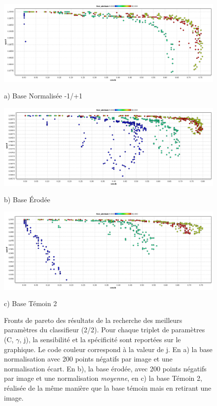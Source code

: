 \begin{figure}[h!]
\begin{center}


\includegraphics[width=14cm]{images/pareto_param_range.png}

{\small a) Base Normalisée -1/+1}

\vspace{0.5cm}

\includegraphics[width=14cm]{images/pareto_param_erosion.png}

{\small b) Base Érodée}

 \includegraphics[width=14cm]{images/pareto_param_200_2.png}

{\small c) Base Témoin 2}

\end{center}
 \caption{Fronts de pareto des résultats de la recherche des meilleurs paramètres du classifieur (2/2). Pour chaque triplet de paramètres (C, $\gamma$, j), la sensibilité et la spécificité sont reportées sur le graphique. Le code couleur correspond à la valeur de j. En a) la base normalisation avec 200 points négatifs par image et une normalisation écart. En b), la base érodée, avec 200 points négatifs par image et une normalisation \emph{moyenne}, en c) la base Témoin 2, réalisée de la même manière que la base témoin mais en retirant une image. }
\label{fig:paretoParams2}
\end{figure}


